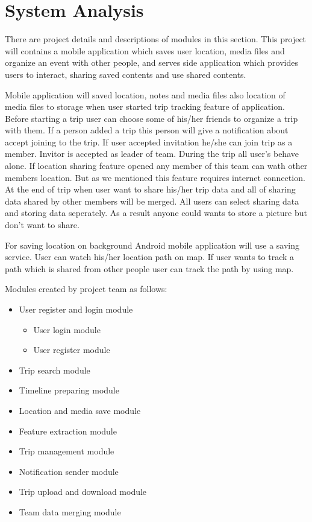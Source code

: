 \chapter{System Analysis}
There are project details and descriptions of modules in this section.
This project will contains a mobile application which saves user location, media files and organize an event with other people, and serves side application which provides users to interact, sharing saved contents and use shared contents. 

Mobile application will saved location, notes and media files also location of media files to storage when user started trip tracking feature of application. Before starting a trip user can choose some of his/her friends to organize a trip with them. If a person added a trip this person will give a notification about accept joining to the trip. If user accepted invitation he/she can join trip as a member. Invitor is accepted as leader of team. During the trip all user's behave alone. If location sharing feature opened any member of this team can wath other members location. But as we mentioned this feature requires internet connection. At the end of trip when user want to share his/her trip data and all of sharing data shared by other members will be merged. All users can select sharing data and storing data seperately. As a result anyone could wants to store a picture but don't want to share. 

For saving location on background Android mobile application will use a saving service. User can watch his/her location path on map. If user wants to track a path which is shared from other people user can track the path by using map.

Modules created by project team as follows:
\begin{itemize}
    \item User register and login module
    \begin{itemize}
        \item User login module
        \item User register module
    \end{itemize}
    \item Trip search module
    \item Timeline preparing module
    \item Location and media save module
    \item Feature extraction module
    \item Trip management module
    \item Notification sender module
    \item Trip upload and download module
    \item Team data merging module
\end{itemize}

 